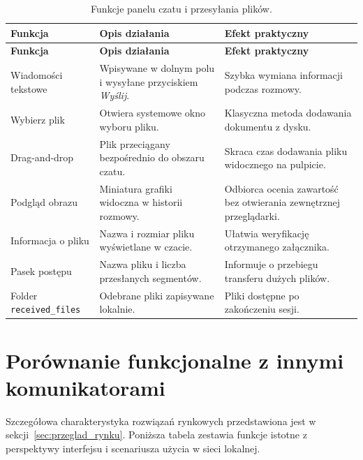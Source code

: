 \begingroup
\small
\setlength{\LTpre}{6pt}
\setlength{\LTpost}{8pt}
\setlength{\tabcolsep}{3pt}
\renewcommand{\arraystretch}{1.18}
\begin{longtable}{|p{}|p{}|p{}|}
	\caption{Funkcje panelu czatu i przesyłania plików.}\label{tab:ui_czat_pliki}\\
	\hline
	\textbf{Funkcja} & \textbf{Opis działania} & \textbf{Efekt praktyczny} \\
	\hline
	\endfirsthead
	\hline
	\textbf{Funkcja} & \textbf{Opis działania} & \textbf{Efekt praktyczny} \\
	\hline
	\endhead
	Wiadomości tekstowe & Wpisywane w dolnym polu i wysyłane przyciskiem
	\textit{Wyślij}. & Szybka wymiana informacji podczas rozmowy. \\
	\hline
	Wybierz plik & Otwiera systemowe okno wyboru pliku. &
	Klasyczna metoda dodawania dokumentu z dysku. \\
	\hline
	Drag-and-drop & Plik przeciągany bezpośrednio do obszaru czatu. &
	Skraca czas dodawania pliku widocznego na pulpicie. \\
	\hline
	Podgląd obrazu & Miniatura grafiki widoczna w historii rozmowy. &
	Odbiorca ocenia zawartość bez otwierania zewnętrznej przeglądarki. \\
	\hline
	Informacja o pliku & Nazwa i rozmiar pliku wyświetlane w czacie. &
	Ułatwia weryfikację otrzymanego załącznika. \\
	\hline
	Pasek postępu & Nazwa pliku i liczba przesłanych segmentów. &
	Informuje o przebiegu transferu dużych plików. \\
	\hline
	Folder \texttt{received\_files} & Odebrane pliki zapisywane lokalnie. &
	Pliki dostępne po zakończeniu sesji. \\
	\hline
\end{longtable}
\endgroup

\section{Porównanie funkcjonalne z innymi komunikatorami}
\label{sec:porownanie_ui}

Szczegółowa charakterystyka rozwiązań rynkowych przedstawiona jest
w sekcji~\ref{sec:przeglad_rynku}. Poniższa tabela zestawia funkcje
istotne z perspektywy interfejsu i scenariusza użycia w sieci lokalnej.

